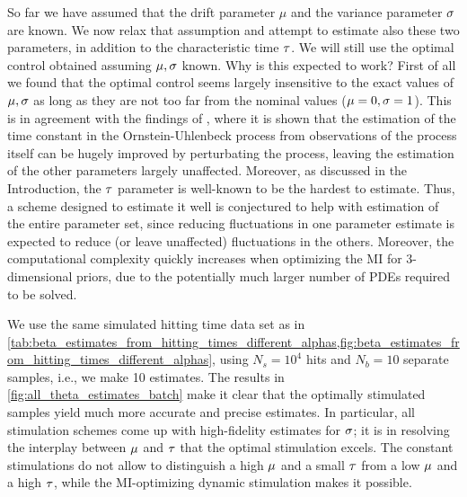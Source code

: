 So far we have assumed that the drift parameter $\mu$ and the variance
parameter $\sigma$ are known. We now relax that
assumption and attempt to estimate also these two parameters,
 in addition to the 
characteristic time ${ \tau }$. We will still use the optimal control obtained assuming
${\mu },\sigma$ known. Why is this expected to work? First of all we found that the
optimal control seems largely insensitive to the exact values of ${\mu },\sigma$ as long
as they are not too far from the nominal values (${\mu }=0, \sigma=1$). This
is in agreement with the findings of
\cite{DitlevsenLansky212}, where it is shown that the estimation of the time constant in the
Ornstein-Uhlenbeck process from observations of the process itself can be hugely improved by perturbating the
process, leaving the estimation of the other parameters largely
unaffected. Moreover, as
discussed in the Introduction, the ${ \tau }$ parameter is well-known to be the
hardest to estimate. Thus, a scheme designed to estimate it well is conjectured
to help with estimation of the entire parameter set, since reducing fluctuations
in one parameter estimate is expected to reduce (or leave unaffected)
fluctuations in the others. Moreover, the computational complexity 
quickly increases when optimizing the MI for
3-dimensional priors, due to the potentially much larger number of PDEs required to be solved.


We use the same simulated hitting time data set as in
\cref{tab:beta_estimates_from_hitting_times_different_alphas,fig:beta_estimates_from_hitting_times_different_alphas},
using $N_s=10^4$ hits and $N_b=10$ separate samples, i.e., we make 10 estimates.
The results in \cref{fig:all_theta_estimates_batch} make it clear that the
optimally stimulated samples yield much more accurate and precise estimates. In
particular, all stimulation schemes come up with high-fidelity estimates for
$\sigma$; it is in resolving the interplay between ${\mu }$ and ${ \tau }$ that the optimal
stimulation excels. The constant stimulations do not allow to distinguish a high
${\mu }$ and a small ${ \tau }$ from a low ${\mu }$ and a high ${ \tau }$, while the
MI-optimizing dynamic stimulation makes it possible.

